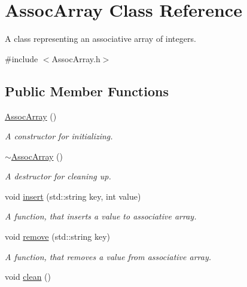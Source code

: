 \hypertarget{class_assoc_array}{\section{Assoc\-Array Class Reference}
\label{class_assoc_array}
}


A class representing an associative array of integers.  




{\ttfamily \#include $<$Assoc\-Array.\-h$>$}

\subsection*{Public Member Functions}
\begin{DoxyCompactItemize}
\item 
\hypertarget{class_assoc_array_a9f50d528fb34e77022df902a99b480c9}{\hyperlink{class_assoc_array_a9f50d528fb34e77022df902a99b480c9}{Assoc\-Array} ()}\label{class_assoc_array_a9f50d528fb34e77022df902a99b480c9}

\begin{DoxyCompactList}\small\item\em A constructor for initializing. \end{DoxyCompactList}\item 
\hypertarget{class_assoc_array_a205392576404e78c4fcfa5156c849c6e}{\hyperlink{class_assoc_array_a205392576404e78c4fcfa5156c849c6e}{$\sim$\-Assoc\-Array} ()}\label{class_assoc_array_a205392576404e78c4fcfa5156c849c6e}

\begin{DoxyCompactList}\small\item\em A destructor for cleaning up. \end{DoxyCompactList}\item 
void \hyperlink{class_assoc_array_ab0031f87fe1843af6fb1248086610c6e}{insert} (std\-::string key, int value)
\begin{DoxyCompactList}\small\item\em A function, that inserts a value to associative array. \end{DoxyCompactList}\item 
void \hyperlink{class_assoc_array_a859a0a7f284c229c28c8581226f8bf0f}{remove} (std\-::string key)
\begin{DoxyCompactList}\small\item\em A function, that removes a value from associative array. \end{DoxyCompactList}\item 
\hypertarget{class_assoc_array_a1b83d24dd0ed8030f43ffa08db8c5942}{void \hyperlink{class_assoc_array_a1b83d24dd0ed8030f43ffa08db8c5942}{clean} ()}\label{class_assoc_array_a1b83d24dd0ed8030f43ffa08db8c5942}


\end{DoxyCompactItemize}
